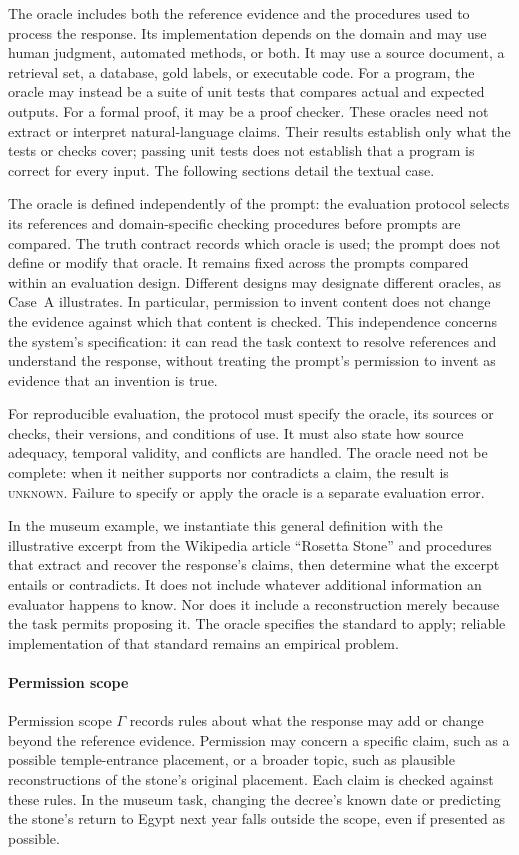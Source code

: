 \documentclass{clv2025}
\begin{document}
The oracle includes both the reference evidence and the procedures used to
process the response. Its implementation depends on the domain and may use
human judgment, automated methods, or both. It may use a source document,
a retrieval set, a database, gold
labels, or executable code. For a program, the oracle may instead be a suite
of unit tests that compares actual and expected outputs. For a formal proof,
it may be a proof checker. These oracles need not extract or interpret
natural-language claims. Their results establish only what the tests or
checks cover; passing unit tests does not establish that a program is correct
for every input. The following sections detail the textual case.

The oracle is defined independently of the prompt: the evaluation protocol
selects its references and domain-specific checking procedures before prompts are
compared. The truth contract records which oracle is used; the prompt does
not define or modify that oracle. It remains fixed across the prompts
compared within an evaluation design. Different designs may designate
different oracles, as Case~A illustrates. In particular, permission to invent
content does not change the evidence against which that content is checked.
This independence concerns the system's specification: it can read the task
context to resolve references and understand the response, without treating
the prompt's permission to invent as evidence that an invention is true.

For reproducible evaluation, the protocol must specify the oracle, its sources
or checks, their versions, and conditions of use. It must also state how source
adequacy, temporal validity, and conflicts are handled. The oracle need not be
complete: when it neither supports nor contradicts a claim, the result is
\textsc{unknown}. Failure to specify or apply the oracle is a separate
evaluation error.

In the museum example, we instantiate this general definition with the
illustrative excerpt from the Wikipedia article ``Rosetta Stone'' and
procedures that extract and recover the response's claims, then determine
what the excerpt entails or contradicts. It does not include
whatever additional information an evaluator happens to know. Nor does it
include a reconstruction merely because the task permits proposing it.
The oracle specifies the standard to apply; reliable implementation of that
standard remains an empirical problem.

\paragraph{Permission scope}
Permission scope $\Gamma$ records rules about what the response may add or
change beyond the reference evidence. Permission may concern a specific
claim, such as a possible temple-entrance placement, or a broader topic, such
as plausible reconstructions of the stone's original placement. Each claim
is checked against these rules. In the museum task, changing the decree's
known date or predicting the stone's return to Egypt next year falls outside
the scope, even if presented as possible.
\end{document}
